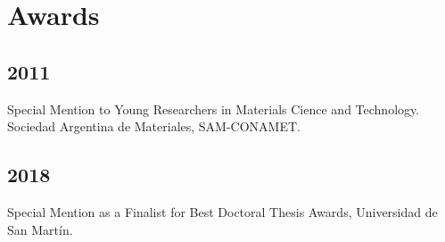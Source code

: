 \section{Awards}

\subsection{2011} Special Mention to Young Researchers in Materials Cience and Technology. Sociedad
Argentina de Materiales, SAM-CONAMET.

\subsection{2018} Special Mention as a Finalist for Best Doctoral Thesis Awards, Universidad de San
Martín. 


